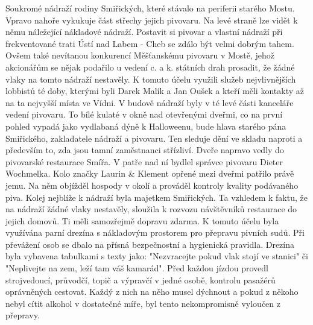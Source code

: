 
Soukromé nádraží rodiny Smiřických, které stávalo na periferii starého
Mostu. Vpravo nahoře vykukuje část střechy jejich pivovaru. Na levé
straně lze vidět k němu náležející nákladové nádraží. Postavit si
pivovar a vlastní nádraží při frekventované trati Ústí nad Labem -
Cheb se zdálo být velmi dobrým tahem. Ovšem také nevítanou konkurencí
Měšťanskému pivovaru v Mostě, jehož akcionářům se nějak podařilo u
vedení c. a k. státních drah prosadit, že žádné vlaky na tomto nádraží
nestavěly. K tomuto účelu využili služeb nejvlivnějších lobbistů té
doby, kterými byli Darek Malík a Jan Oušek a kteří měli kontakty až na
ta nejvyšší místa ve Vídni. V budově nádraží byly v té levé části
kanceláře vedení pivovaru. To bílé kulaté v okně nad otevřenými
dveřmi, co na první pohled vypadá jako vydlabaná dýně k Halloweenu,
bude hlava starého pána Smiřického, zakladatele nádraží a pivovaru.
Ten sleduje dění ve skladu naproti a především to, zda jsou tamní
zaměstnanci střízliví. Dveře napravo vedly do pivovarské restaurace
Smířa. V patře nad ní bydlel správce pivovaru Dieter Wochmelka. Kolo
značky Laurin & Klement opřené mezi dveřmi patřilo právě jemu. Na něm
objížděl hospody v okolí a prováděl kontroly kvality podávaného piva.
Kolej nejblíže k nádraží byla majetkem Smiřických. Ta vzhledem k
faktu, že na nádraží žádné vlaky nestavěly, sloužila k rozvozu
návštěvníků restaurace do jejich domovů. Ti měli samozřejmě dopravu
zdarma. K tomuto účelu byla využívána parní drezína s nákladovým
prostorem pro přepravu pivních sudů. Při převážení osob se dbalo na
přísná bezpečnostní a hygienická pravidla. Drezína byla vybavena
tabulkami s texty jako: "Nezvracejte pokud vlak stojí ve stanici" či
"Neplivejte na zem, leží tam váš kamarád". Před každou jízdou provedl
strojvedoucí, průvodčí, topič a výpravčí v jedné osobě, kontrolu
pasažérů oprávněných cestovat. Každý z nich na něho musel dýchnout a
pokud z někoho nebyl cítit alkohol v dostatečné míře, byl tento
nekompromisně vyloučen z přepravy.


